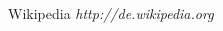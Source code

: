 \begin{thebibliography}{widest entry}

 Wikipedia \emph{http://de.wikipedia.org}

\end{thebibliography}